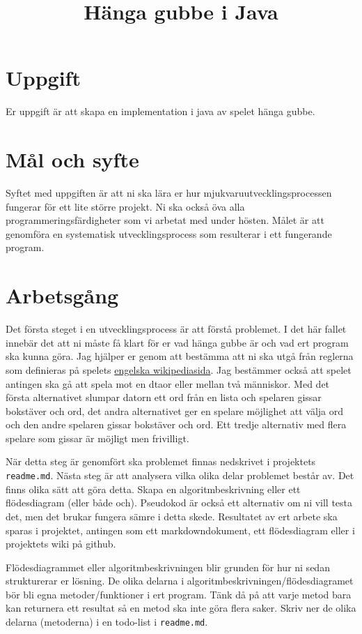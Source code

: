 \documentclass[11pt]{article}
\begin{document}
\title{Hänga gubbe i Java}
    \maketitle
    \section{Uppgift}
    Er uppgift är att skapa en implementation i java av spelet hänga gubbe.
    \section{Mål och syfte}
    Syftet med uppgiften är att ni ska lära er hur mjukvaruutvecklingsprocessen fungerar för ett lite större projekt.
    Ni ska också öva alla programmeringsfärdigheter som vi arbetat med under hösten. Målet är att genomföra en systematisk
    utvecklingsprocess som resulterar i ett fungerande program.
    \section{Arbetsgång}
    Det första steget i en utvecklingsprocess är att förstå problemet. I det här fallet innebär det att ni måste få klart
    för er vad hänga gubbe är och vad ert program ska kunna göra. Jag hjälper er genom att bestämma att ni ska utgå från
    reglerna som definieras på spelets \href{https://en.wikipedia.org/wiki/Hangman_(game)}{engelska wikipediasida}. Jag
    bestämmer också att spelet antingen ska gå att spela mot en dtaor eller mellan två människor. Med det första
    alternativet slumpar datorn ett ord från en lista och spelaren gissar bokstäver och ord, det andra alternativet ger en
    spelare möjlighet att välja ord och den andre spelaren gissar bokstäver och ord. Ett tredje alternativ med flera spelare
    som gissar är möjligt men frivilligt.

    När detta steg är genomfört ska problemet finnas nedskrivet i projektets \texttt{readme.md}. Nästa steg är att analysera
    vilka olika delar problemet består av. Det finns olika sätt att göra detta. Skapa en algoritmbeskrivning eller ett
    flödesdiagram (eller både och). Pseudokod är också ett alternativ om ni vill testa det, men det brukar fungera sämre i detta skede.
    Resultatet av ert arbete ska sparas i projektet, antingen som ett markdowndokument, ett flödesdiagram eller i projektets wiki på github.

    Flödesdiagrammet eller algoritmbeskrivningen blir grunden för hur ni sedan strukturerar er lösning. De olika delarna i
    algoritmbeskrivningen/flödesdiagramet bör bli egna metoder/funktioner i ert program. Tänk då på att varje metod bara kan returnera ett
    resultat så en metod ska inte göra flera saker. Skriv ner de olika delarna (metoderna) i en todo-list i \texttt{readme.md}.
\end{document}
